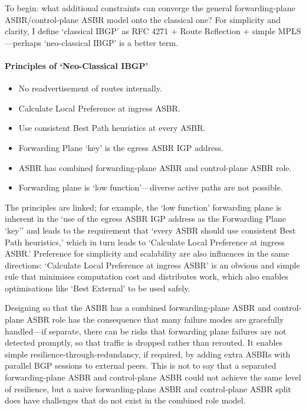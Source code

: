 To begin: what additional constraints can converge the general forwarding-plane ASBR/control-plane ASBR model onto the classical one? For simplicity and clarity, I define `classical IBGP' as RFC 4271 + Route Reflection + simple MPLS—perhaps `neo-classical IBGP' is a better term.

\paragraph{Principles of `Neo-Classical IBGP'}

\begin{itemize}
	\item No readvertisement of routes internally.
	\item Calculate Local Preference at ingress ASBR.
	\item Use consistent Best Path heuristics at every ASBR.
	\item Forwarding Plane `key' is the egress ASBR IGP address.
	\item ASBR has combined forwarding-plane ASBR and control-plane ASBR role.
	\item Forwarding plane is `low function'—diverse active paths are not possible.
\end{itemize}

The principles are linked; for example, the `low function' forwarding plane is inherent in the `use of the egress ASBR IGP address as the Forwarding Plane `key'' and leads to the requirement that `every ASBR should use consistent Best Path heuristics,' which in turn leads to `Calculate Local Preference at ingress ASBR.' Preference for simplicity and scalability are also influences in the same directions: `Calculate Local Preference at ingress ASBR' is an obvious and simple rule that minimises computation cost and distributes work, which also enables optimisations like `Best External' to be used safely.

Designing so that the ASBR has a combined forwarding-plane ASBR and control-plane ASBR role has the consequence that many failure modes are gracefully handled—if separate, there can be risks that forwarding plane failures are not detected promptly, so that traffic is dropped rather than rerouted. It enables simple resilience-through-redundancy, if required, by adding extra ASBRs with parallel BGP sessions to external peers. This is not to say that a separated forwarding-plane ASBR and control-plane ASBR could not achieve the same level of resilience, but a naive forwarding-plane ASBR and control-plane ASBR split does have challenges that do not exist in the combined role model.

